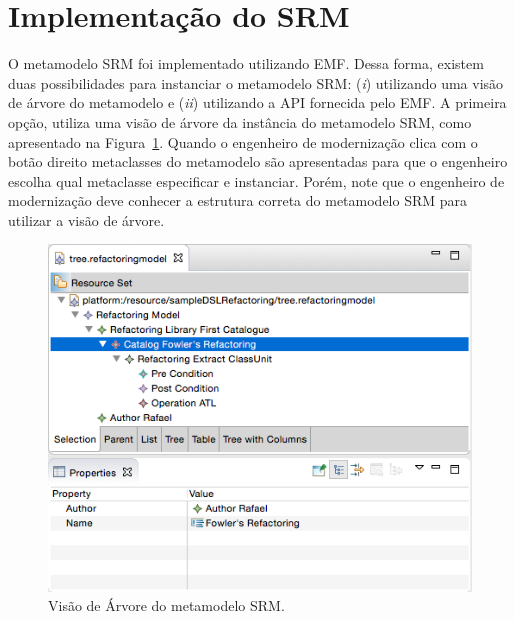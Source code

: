 \section{Implementação do SRM}\label{sec:implementacao_do_SRM}

O metamodelo SRM foi implementado utilizando EMF. Dessa forma, existem duas possibilidades para instanciar o metamodelo SRM: (\textit{i}) utilizando uma visão de árvore do metamodelo e (\textit{ii}) utilizando a API fornecida pelo EMF. A primeira opção, utiliza uma visão de árvore da instância do metamodelo SRM, como apresentado na Figura~\ref{fig:visao_arvore_metamodelo_srm}. Quando o engenheiro de modernização clica com o botão direito metaclasses do metamodelo são apresentadas para que o engenheiro escolha qual metaclasse especificar e instanciar. Porém, note que o engenheiro de modernização deve conhecer a estrutura correta do metamodelo SRM para utilizar a visão de árvore. 

\begin{figure}[h]
	\centering
	\caption{Visão de Árvore do metamodelo SRM.}
	\label{fig:visao_arvore_metamodelo_srm}
	\includegraphics[scale=0.65]{images/tree_srm}
	\fautor
\end{figure}


